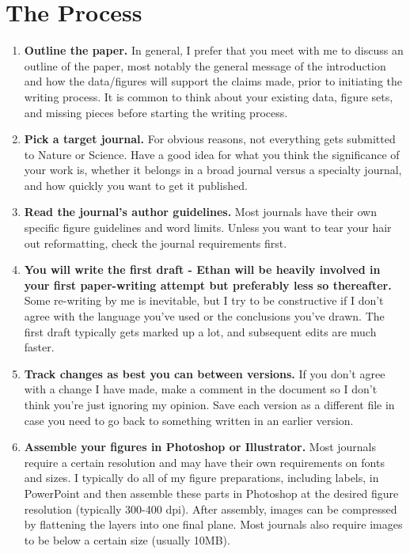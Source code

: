 \documentclass[
]{book}
\begin{document}
\hypertarget{the-process}{%
\section{The Process}\label{the-process}}

\begin{enumerate}
\def\labelenumi{\arabic{enumi}.}
\item
  \textbf{Outline the paper.} In general, I prefer that you meet with me to discuss an outline of the paper, most notably the general message of the introduction and how the data/figures will support the claims made, prior to initiating the writing process. It is common to think about your existing data, figure sets, and missing pieces before starting the writing process.
\item
  \textbf{Pick a target journal.} For obvious reasons, not everything gets submitted to Nature or Science. Have a good idea for what you think the significance of your work is, whether it belongs in a broad journal versus a specialty journal, and how quickly you want to get it published.
\item
  \textbf{Read the journal's author guidelines.} Most journals have their own specific figure guidelines and word limits. Unless you want to tear your hair out reformatting, check the journal requirements first.
\item
  \textbf{You will write the first draft - Ethan will be heavily involved in your first paper-writing attempt but preferably less so thereafter.} Some re-writing by me is inevitable, but I try to be constructive if I don't agree with the language you've used or the conclusions you've drawn. The first draft typically gets marked up a lot, and subsequent edits are much faster.
\item
  \textbf{Track changes as best you can between versions.} If you don't agree with a change I have made, make a comment in the document so I don't think you're just ignoring my opinion. Save each version as a different file in case you need to go back to something written in an earlier version.
\item
  \textbf{Assemble your figures in Photoshop or Illustrator.} Most journals require a certain resolution and may have their own requirements on fonts and sizes. I typically do all of my figure preparations, including labels, in PowerPoint and then assemble these parts in Photoshop at the desired figure resolution (typically 300-400 dpi). After assembly, images can be compressed by flattening the layers into one final plane. Most journals also require images to be below a certain size (usually 10MB).


\end{enumerate}
\end{document}
